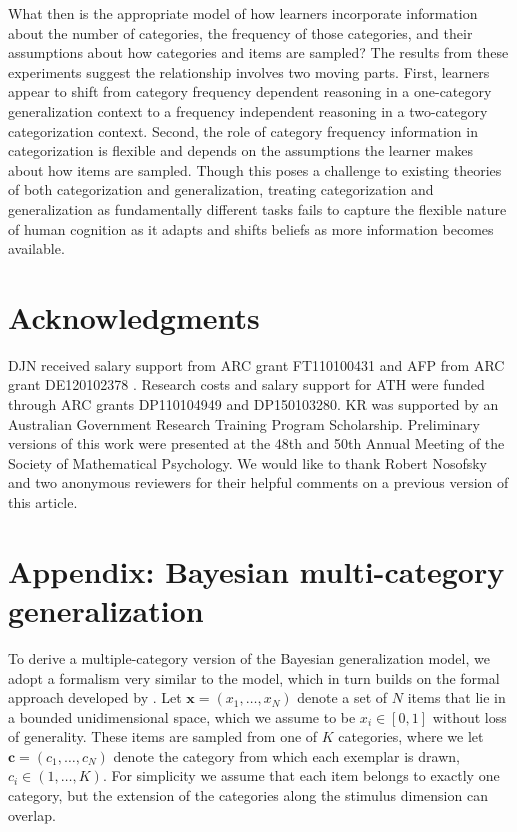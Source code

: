 \documentclass[doc,apacite]{apa6}
\begin{document}
What then is the appropriate model of how learners incorporate information about the number of categories, the frequency of those categories, and their assumptions about how categories and items are sampled? The results from these experiments suggest the relationship involves two moving parts. First, learners appear to shift from category frequency dependent reasoning in a one-category generalization context to a frequency independent reasoning in a two-category categorization context. Second, the role of category frequency information in categorization is flexible and depends on the assumptions the learner makes about how items are sampled.
Though this poses a challenge to existing theories of both categorization and generalization, treating categorization and generalization as fundamentally different tasks fails to capture the flexible nature of human cognition as it adapts and shifts beliefs as more information becomes available.

\section{Acknowledgments}

DJN received salary support from ARC grant FT110100431 and AFP from ARC grant DE120102378 . Research costs and salary support for ATH were funded through ARC grants DP110104949 and DP150103280. KR was supported by an Australian Government Research Training Program Scholarship.
Preliminary versions of this work were presented at the 48th and 50th Annual Meeting of the Society of Mathematical Psychology.
We would like to thank Robert Nosofsky and two anonymous reviewers for their helpful comments on a previous version of this article.


\nocite{*}



\section*{Appendix: Bayesian multi-category generalization}

To derive a multiple-category version of the Bayesian generalization model, we adopt a formalism very similar to the  model, which in turn builds on the formal approach developed by . Let $\bm{x}=(x_1,\ldots,x_N)$ denote a set of $N$ items that lie in a bounded unidimensional space, which we assume to be $x_i \in [0,1]$ without loss of generality. These items are sampled from one of $K$ categories, where we let $\bm{c}=(c_1,\ldots,c_N)$ denote the category from which each exemplar is drawn, $c_i \in (1,\ldots,K)$. For simplicity we assume that each item belongs to exactly one category, but the extension of the categories along the stimulus dimension can overlap.
\end{document}
